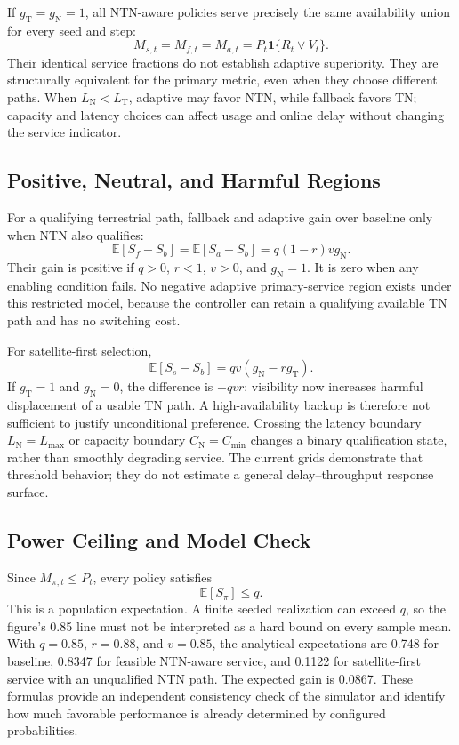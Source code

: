 \documentclass[10pt,twocolumn]{article}
\newcommand{\ind}{\mathbf{1}}
\newcommand{\TN}{\mathrm{T}}
\newcommand{\NTN}{\mathrm{N}}
\begin{document}
If $g_\TN=g_\NTN=1$, all NTN-aware policies serve precisely the same availability union for every seed and step:
\begin{equation}\label{eq:equivalence}
 M_{s,t}=M_{f,t}=M_{a,t}=P_t\ind\{R_t\lor V_t\}.
\end{equation}
Their identical service fractions do not establish adaptive superiority. They are structurally equivalent for the primary metric, even when they choose different paths. When $L_\NTN<L_\TN$, adaptive may favor NTN, while fallback favors TN; capacity and latency choices can affect usage and online delay without changing the service indicator.

\subsection{Positive, Neutral, and Harmful Regions}
For a qualifying terrestrial path, fallback and adaptive gain over baseline only when NTN also qualifies:
\begin{equation}\label{eq:gain}
 \mathbb E[S_f-S_b]=\mathbb E[S_a-S_b]=q(1-r)vg_\NTN.
\end{equation}
Their gain is positive if $q>0$, $r<1$, $v>0$, and $g_\NTN=1$. It is zero when any enabling condition fails. No negative adaptive primary-service region exists under this restricted model, because the controller can retain a qualifying available TN path and has no switching cost.

For satellite-first selection,
\begin{equation}\label{eq:staticgain}
 \mathbb E[S_s-S_b]=qv(g_\NTN-rg_\TN).
\end{equation}
If $g_\TN=1$ and $g_\NTN=0$, the difference is $-qvr$: visibility now increases harmful displacement of a usable TN path. A high-availability backup is therefore not sufficient to justify unconditional preference. Crossing the latency boundary $L_\NTN=L_{\max}$ or capacity boundary $C_\NTN=C_{\min}$ changes a binary qualification state, rather than smoothly degrading service. The current grids demonstrate that threshold behavior; they do not estimate a general delay--throughput response surface.

\subsection{Power Ceiling and Model Check}
Since $M_{\pi,t}\le P_t$, every policy satisfies
\begin{equation}\label{eq:ceiling}
 \mathbb E[S_\pi]\le q.
\end{equation}
This is a population expectation. A finite seeded realization can exceed $q$, so the figure's 0.85 line must not be interpreted as a hard bound on every sample mean. With $q=0.85$, $r=0.88$, and $v=0.85$, the analytical expectations are 0.748 for baseline, 0.8347 for feasible NTN-aware service, and 0.1122 for satellite-first service with an unqualified NTN path. The expected gain is 0.0867. These formulas provide an independent consistency check of the simulator and identify how much favorable performance is already determined by configured probabilities.
\end{document}
